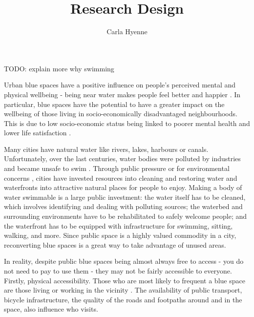 \documentclass{article}
\title{Research Design}
\author{Carla Hyenne}
\date{}
\begin{document}
\maketitle


TODO: explain more why swimming

Urban blue spaces have a positive influence on people's perceived mental and physical wellbeing - being near water makes people feel better and happier \parencite{gascon2017outdoor}.
In particular, blue spaces have the potential to have a greater impact on the wellbeing of those living in socio-economically disadvantaged neighbourhoods. This is due to low socio-economic status being linked to poorer mental health and lower life satisfaction \parencite{van2021urban}.

Many cities have natural water like rivers, lakes, harbours or canals. Unfortunately, over the last centuries, water bodies were polluted by industries and became unsafe to swim \parencite{???}. Through public pressure or for environmental concerns \parencite{???}, cities have invested resources into cleaning and restoring water and waterfronts into attractive natural places for people to enjoy.
Making a body of water swimmable is a large public investment: the water itself has to be cleaned, which involves identifying and dealing with polluting sources; the waterbed and surrounding environments have to be rehabilitated to safely welcome people; and the waterfront has to be equipped with infrastructure for swimming, sitting, walking, and more.
Since public space is a highly valued commodity in a city, reconverting blue spaces is a great way to take advantage of unused areas.


In reality, despite public blue spaces being almost always free to access - you do not need to pay to use them - they may not be fairly accessible to everyone. 
Firstly, physical accessibility. Those who are most likely to frequent a blue space are those living or working in the vicinity \parencite{???}. The availability of public transport, bicycle infrastructure, the quality of the roads and footpaths around and in the space, also influence who visits.
\end{document}
